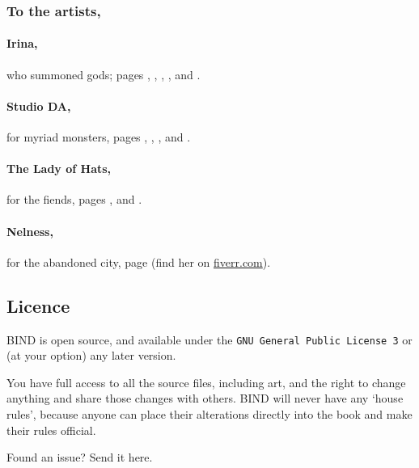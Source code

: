 \begin{multicols}{2}
\subsubsection{To the artists,}
\paragraph{Irina,}
who summoned gods; pages
\pageref{Irina/old_age},
\pageref{Irina/justice},
\pageref{Irina/forest},
\pageref{Irina/fury},
and
\pageref{Irina/curiosity}.

\paragraph{Studio DA,}
for myriad monsters,
pages
\pageref{Studio_DA/chitincrawler}, 
\pageref{Studio_DA/woodspy},
\pageref{Studio_DA/ogre},
and
\pageref{Studio_DA/jelly}.

\paragraph{The Lady of Hats,}
for the fiends,
pages
\pageref{loh/dryad}, 
and
\pageref{loh/dragon}.

\paragraph{Nelness,}
for the abandoned city,
page
\pageref{Nelness/city}
(find her on \href{https://www.fiverr.com/nelnes}{fiverr.com}).

\subsection*{Licence}

BIND is open source, and available under the {\tt GNU General Public License 3} or (at your option) any later version.

You have full access to all the source files, including art, and the right to change anything and share those changes with others.
BIND will never have any `house rules', because anyone can place their alterations directly into the book and make their rules official.

\begin{center}
  
  Found an issue?
  Send it here.
\end{center}

\end{multicols}
